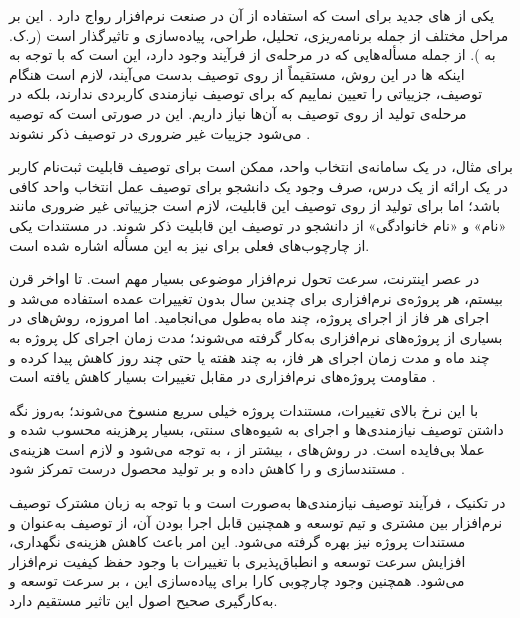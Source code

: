     یکی
از ‌های جدید برای  است که استفاده از آن در
صنعت نرم‌افزار رواج دارد . این  بر
مراحل مختلف  از جمله برنامه‌ریزی، تحلیل، طراحی،
پیاده‌سازی و  تاثیرگذار است (ر.ک. به
). از جمله مسأله‌هایی که در مرحله‌ی  از
فرآیند  وجود دارد، این است که با توجه به اینکه
 ها در این روش، مستقیماً از روی توصیف بدست می‌آیند،
لازم است هنگام توصیف، جزییاتی را تعیین نماییم که برای توصیف نیازمندی
کاربردی ندارند، بلکه در مرحله‌ی تولید  از روی توصیف
به آن‌ها نیاز داریم. این در صورتی است که توصیه می‌شود جزییات غیر ضروری
در توصیف ذکر نشوند .

برای مثال، در یک سامانه‌ی انتخاب واحد، ممکن است برای توصیف قابلیت
ثبت‌نام کاربر در یک ارائه از یک درس، صرف وجود یک دانشجو برای توصیف عمل
انتخاب واحد کافی باشد؛ اما برای تولید  از روی توصیف
این قابلیت، لازم است جزییاتی غیر ضروری مانند «نام» و «نام خانوادگی» از دانشجو
در توصیف این قابلیت ذکر شوند. در مستندات یکی از چارچوب‌های فعلی برای
  نیز به این مسأله اشاره شده است.

در عصر اینترنت، سرعت تحول نرم‌افزار موضوعی بسیار مهم است. تا اواخر قرن
بیستم، هر پروژه‌ی نرم‌افزاری برای چندین سال بدون تغییرات عمده استفاده
می‌شد و اجرای هر فاز از اجرای پروژه، چند ماه به‌طول می‌انجامید. اما
امروزه، روش‌های  در بسیاری از پروژه‌های نرم‌افزاری به‌کار
گرفته می‌شوند؛ مدت زمان اجرای کل پروژه به چند ماه و مدت زمان اجرای هر
فاز، به چند هفته یا حتی چند روز کاهش پیدا کرده و مقاومت پروژه‌های
نرم‌افزاری در مقابل تغییرات بسیار کاهش یافته است .

با این نرخ بالای تغییرات، مستندات پروژه خیلی سریع منسوخ می‌شوند؛ به‌روز
نگه داشتن توصیف نیازمندی‌ها و اجرای  به شیوه‌های سنتی، بسیار
پرهزینه محسوب شده و عملا بی‌فایده است. در روش‌های ،
بیشتر از ، به
 توجه می‌شود و لازم
است هزینه‌ی مستندسازی و  را کاهش داده و بر تولید محصول درست
تمرکز شود .

در تکنیک ، فرآیند توصیف نیازمندی‌ها به‌صورت
 است و با توجه به زبان مشترک توصیف نرم‌افزار بین مشتری و
تیم توسعه و همچنین قابل اجرا بودن آن، از توصیف به‌عنوان  و
مستندات پروژه نیز بهره گرفته می‌شود. این امر باعث کاهش هزینه‌ی نگهداری،
افزایش سرعت توسعه  و انطباق‌پذیری با تغییرات با وجود حفظ
کیفیت نرم‌افزار می‌شود. همچنین وجود چارچوبی کارا برای پیاده‌سازی این
، بر سرعت توسعه و به‌کارگیری صحیح اصول این 
تاثیر مستقیم دارد.

